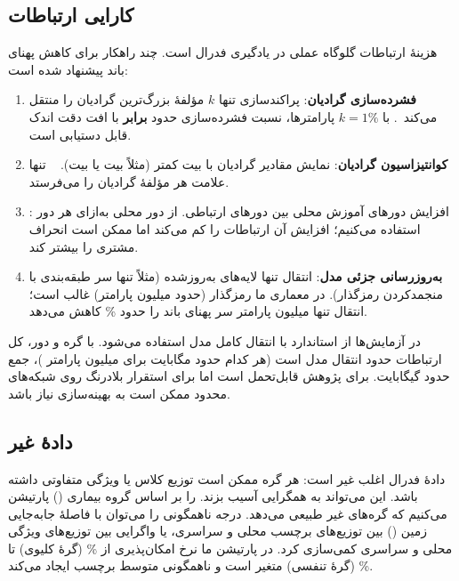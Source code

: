 \subsection{کارایی ارتباطات}

هزینۀ ارتباطات گلوگاه عملی در یادگیری فدرال است. چند راهکار برای کاهش پهنای باند پیشنهاد شده است:

\begin{enumerate}
\item \textbf{فشرده‌سازی گرادیان}: پراکندسازی  تنها $k$ مؤلفۀ بزرگ‌ترین گرادیان را منتقل می‌کند~\cite{alistarh2017qsgd}. با $k = 1\%$ پارامترها، نسبت فشرده‌سازی حدود \textbf{ برابر} با افت دقت اندک قابل دستیابی است.
\item \textbf{کوانتیزاسیون گرادیان}: نمایش مقادیر گرادیان با بیت کمتر (مثلاً  بیت یا  بیت). ~\cite{bernstein2018signsgd} تنها علامت هر مؤلفۀ گرادیان را می‌فرستد.
\item {}: افزایش دورهای آموزش محلی بین دورهای ارتباطی. از  دور محلی به‌ازای هر دور استفاده می‌کنیم؛ افزایش آن ارتباطات را کم می‌کند اما ممکن است انحراف مشتری را بیشتر کند.
\item \textbf{به‌روزرسانی جزئی مدل}: انتقال تنها لایه‌های به‌روزشده (مثلاً تنها سر طبقه‌بندی با منجمدکردن رمزگذار). در معماری ما رمزگذار (حدود  میلیون پارامتر) غالب است؛ انتقال تنها  میلیون پارامتر سر پهنای باند را حدود \% کاهش می‌دهد.
\end{enumerate}

در آزمایش‌ها از  استاندارد با انتقال کامل مدل استفاده می‌شود. با  گره و  دور، کل ارتباطات حدود  انتقال مدل است (هر کدام حدود  مگابایت برای  میلیون پارامتر )، جمع حدود  گیگابایت. برای پژوهش قابل‌تحمل است اما برای استقرار بلادرنگ روی شبکه‌های محدود ممکن است به بهینه‌سازی نیاز باشد.

\subsection{دادۀ غیر }

دادۀ فدرال اغلب غیر  است: هر گره ممکن است توزیع کلاس یا ویژگی متفاوتی داشته باشد. این می‌تواند به همگرایی آسیب بزند.  را بر اساس گروه بیماری () پارتیشن می‌کنیم که گره‌های غیر  طبیعی می‌دهد. درجه ناهمگونی را می‌توان با فاصلۀ جابه‌جایی زمین () بین توزیع‌های برچسب محلی و سراسری، یا واگرایی  بین توزیع‌های ویژگی محلی و سراسری کمی‌سازی کرد. در پارتیشن ما نرخ امکان‌پذیری از \% (گرۀ کلیوی) تا \% (گرۀ تنفسی) متغیر است و ناهمگونی متوسط برچسب ایجاد می‌کند.

